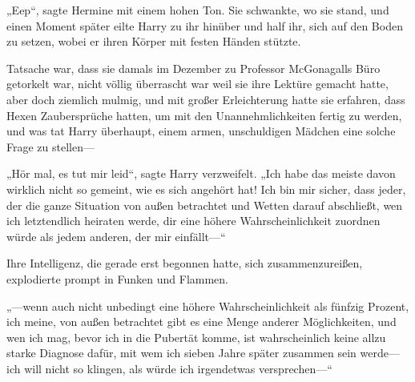 „Eep“, sagte Hermine mit einem hohen Ton.
Sie schwankte, wo sie stand, und einen Moment später eilte Harry zu ihr hinüber und half ihr, sich auf den Boden zu setzen, wobei er ihren Körper mit festen Händen stützte.

Tatsache war, dass sie damals im Dezember zu Professor McGonagalls Büro getorkelt war, nicht völlig überrascht war weil sie ihre Lektüre gemacht hatte, aber doch ziemlich mulmig, und mit großer Erleichterung hatte sie erfahren, dass Hexen Zaubersprüche hatten, um mit den Unannehmlichkeiten fertig zu werden, und was tat Harry überhaupt, einem armen, unschuldigen Mädchen eine solche Frage zu stellen—

„Hör mal, es tut mir leid“, sagte Harry verzweifelt. „Ich habe das meiste davon wirklich nicht so gemeint, wie es sich angehört hat! Ich bin mir sicher, dass jeder, der die ganze Situation von außen betrachtet und Wetten darauf abschließt, wen ich letztendlich heiraten werde, dir eine höhere Wahrscheinlichkeit zuordnen würde als jedem anderen, der mir einfällt—“

Ihre Intelligenz, die gerade erst begonnen hatte, sich zusammenzureißen, explodierte prompt in Funken und Flammen.

„—wenn auch nicht unbedingt eine höhere Wahrscheinlichkeit als fünfzig Prozent, ich meine, von außen betrachtet gibt es eine Menge anderer Möglichkeiten, und wen ich mag, bevor ich in die Pubertät komme, ist wahrscheinlich keine allzu starke Diagnose dafür, mit wem ich sieben Jahre später zusammen sein werde—ich will nicht so klingen, als würde ich irgendetwas versprechen—“

